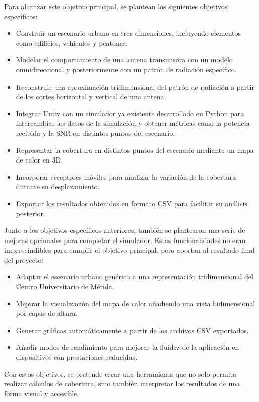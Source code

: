 Para alcanzar este objetivo principal, se plantean los siguientes objetivos específicos:

\begin{itemize}
    \item Construir un escenario urbano en tres dimensiones, incluyendo elementos como edificios, vehículos y peatones.
    \item Modelar el comportamiento de una antena transmisora con un modelo omnidireccional y posteriormente con un patrón de radiación específico.
    \item Reconstruir una aproximación tridimensional del patrón de radiación a partir de los cortes horizontal y vertical de una antena.
    \item Integrar Unity con un simulador ya existente desarrollado en Python para intercambiar los datos de la simulación y obtener métricas como la potencia recibida y la SNR en distintos puntos del escenario.
    \item Representar la cobertura en distintos puntos del escenario mediante un mapa de calor en 3D.
    \item Incorporar receptores móviles para analizar la variación de la cobertura durante su desplazamiento.
    \item Exportar los resultados obtenidos en formato CSV para facilitar su análisis posterior.
\end{itemize}

Junto a los objetivos específicos anteriores, también se plantearon una serie de mejoras opcionales para completar el simulador. Estas funcionalidades no eran imprescindibles para cumplir el objetivo principal, pero aportan al resultado final del proyecto:

\begin{itemize}
    \item Adaptar el escenario urbano genérico a una representación tridimensional del Centro Universitario de Mérida.
    \item Mejorar la visualización del mapa de calor añadiendo una vista bidimensional por capas de altura.
    \item Generar gráficas automáticamente a partir de los archivos CSV exportados.
    \item Añadir modos de rendimiento para mejorar la fluidez de la aplicación en dispositivos con prestaciones reducidas.
\end{itemize}

Con estos objetivos, se pretende crear una herramienta que no solo permita realizar cálculos de cobertura, sino también interpretar los resultados de una forma visual y accesible.

